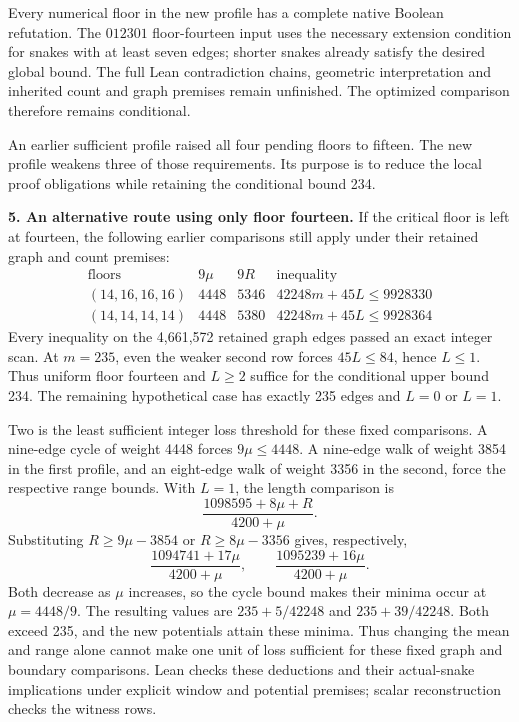 \documentclass[11pt,a4paper]{article}
\begin{document}
Every numerical floor in the new profile has a complete native Boolean
refutation. The $012301$ floor-fourteen input uses the necessary extension
condition for snakes with at least seven edges; shorter snakes already
satisfy the desired global bound. The full Lean contradiction chains,
geometric interpretation and inherited count and graph premises remain
unfinished. The optimized comparison therefore remains conditional.

An earlier sufficient profile raised all four pending floors to fifteen.
The new profile weakens three of those requirements. Its purpose is to
reduce the local proof obligations while retaining the conditional bound 234.

\textbf{5. An alternative route using only floor fourteen.}
If the critical floor is left at fourteen, the following earlier
comparisons still apply under their retained graph and count premises:
\[
\begin{array}{c|c|c|c}
\text{floors}&9\mu&9R&\text{inequality}\\\hline
(14,16,16,16)&4448&5346&42248m+45L\le9928330\\
(14,14,14,14)&4448&5380&42248m+45L\le9928364
\end{array}
\]
Every inequality on the 4,661,572 retained graph edges passed an exact
integer scan. At $m=235$, even the weaker second row forces
$45L\le84$, hence $L\le1$. Thus uniform floor fourteen and $L\ge2$
suffice for the conditional upper bound 234. The remaining hypothetical
case has exactly 235 edges and $L=0$ or $L=1$.

Two is the least sufficient integer loss threshold for these fixed
comparisons. A nine-edge cycle of weight 4448 forces $9\mu\le4448$.
A nine-edge walk of weight 3854 in the first profile, and an eight-edge
walk of weight 3356 in the second, force the respective range bounds.
With $L=1$, the length comparison is
\[
\frac{1098595+8\mu+R}{4200+\mu}.
\]
Substituting $R\ge9\mu-3854$ or $R\ge8\mu-3356$ gives, respectively,
\[
\frac{1094741+17\mu}{4200+\mu},\qquad
\frac{1095239+16\mu}{4200+\mu}.
\]
Both decrease as $\mu$ increases, so the cycle bound makes their minima
occur at $\mu=4448/9$. The resulting values are
$235+5/42248$ and $235+39/42248$. Both exceed 235, and the new potentials
attain these minima. Thus changing the mean and range alone cannot make
one unit of loss sufficient for these fixed graph and boundary comparisons. Lean checks
these deductions and their actual-snake implications under explicit window
and potential premises; scalar reconstruction checks the witness rows.
\end{document}
